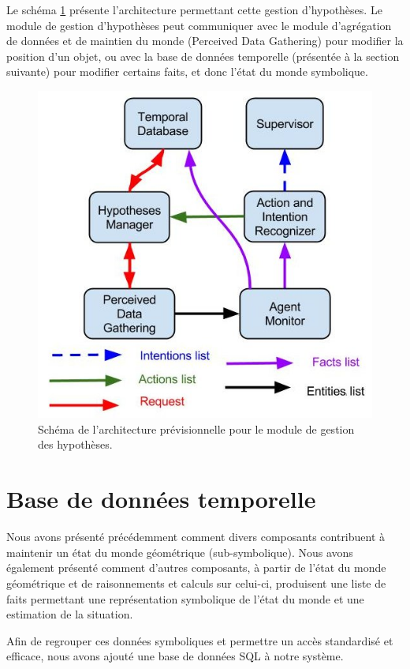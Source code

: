 \documentclass[a4paper,11pt,twoside]{StyleThese}
\begin{document}
Le schéma \ref{fig:hypo} présente l'architecture permettant cette gestion d'hypothèses. Le module de gestion d'hypothèses peut communiquer avec le module d'agrégation de données et de maintien du monde (Perceived Data Gathering) pour modifier la position d'un objet, ou avec la base de données temporelle (présentée à la section suivante) pour modifier certains faits, et donc l'état du monde symbolique.

\begin{figure}[ht!]
 \centering
  \includegraphics[width=0.7\linewidth]{./img/hypotheses_manager.jpg} 
  \caption {Schéma de l'architecture prévisionnelle pour le module de gestion des hypothèses.}
  \label{fig:hypo}
\end{figure}


\section{Base de données temporelle}
\label{sec:db}


Nous avons présenté précédemment comment divers composants contribuent à maintenir un état du monde géométrique (sub-symbolique). Nous avons également présenté comment d'autres composants, à partir de l'état du monde géométrique et de raisonnements et calculs sur celui-ci, produisent une liste de faits permettant une représentation symbolique de l'état du monde et une estimation de la situation.

Afin de regrouper ces données symboliques et permettre un accès standardisé et efficace, nous avons ajouté une base de données SQL à notre système.
\end{document}

